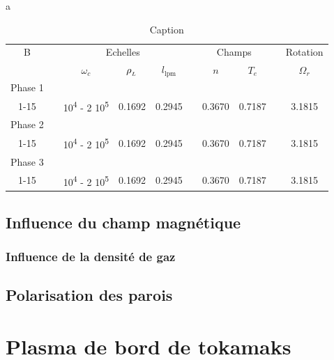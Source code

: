 \begin{refsection}
a
\begin{table}
\footnotesize\centering
{}
\begin{tabular}{@{}cccccccccc@{}}\toprule
B&&\multicolumn{3}{c}{Echelles} && \multicolumn{2}{c}{Champs} &&
Rotation\\
\cmidrule{3-5} \cmidrule{7-8} \cmidrule{10-10}
&& $\omega_c$ & $\rho_{_{L}}$& $l_{\text{lpm}}$&& $n$ & $T_e$ && 
$\Omega_r$\\
\midrule Phase 1\\
\scriptsize 1-15 &&\scriptsize 10\textsuperscript{4} - 2 10\textsuperscript{5} &
\scriptsize0.1692 &\scriptsize 0.2945 && \scriptsize0.3670 &\scriptsize 0.7187
&& \scriptsize3.1815 \\
Phase 2\\
\scriptsize1-15 &&\scriptsize 10\textsuperscript{4} - 2 10\textsuperscript{5} &
\scriptsize0.1692 &\scriptsize 0.2945 &&\scriptsize 0.3670 &\scriptsize 0.7187
&&\scriptsize 3.1815 \\
Phase 3\\
\scriptsize1-15 &&\scriptsize 10\textsuperscript{4} - 2 10\textsuperscript{5} &
\scriptsize0.1692 &\scriptsize 0.2945 &&\scriptsize 0.3670 &\scriptsize 0.7187
&&\scriptsize 3.1815 \\

\bottomrule
\end{tabular}
\caption{Caption}
\end{table}
	
	\subsection{Influence du champ magnétique}
	\subsubsection{Influence de la densité de gaz}
\subsection{Polarisation des parois}
		

\section{Plasma de bord de tokamaks}
%
%
\end{refsection}
